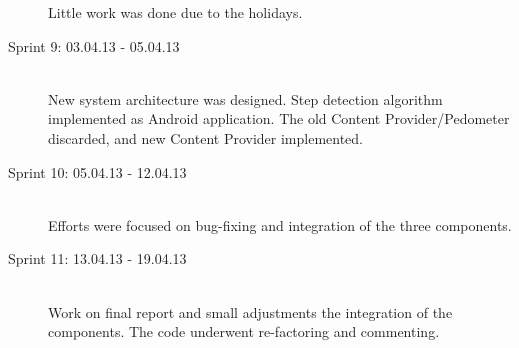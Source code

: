 \begin{description}
Little work was done due to the holidays.
\item[Sprint 9: 03.04.13 - 05.04.13] \hline \hfill \\
New system architecture was designed. Step detection algorithm implemented as Android application. The old Content Provider/Pedometer discarded, and new Content Provider implemented. 
\item[Sprint 10: 05.04.13 - 12.04.13] \hline \hfill \\
Efforts were focused on bug-fixing and integration of the three components. 
\item[Sprint 11: 13.04.13 - 19.04.13] \hline \hfill \\
Work on final report and small adjustments the integration of the components. The code underwent re-factoring and commenting. 
\end{description}